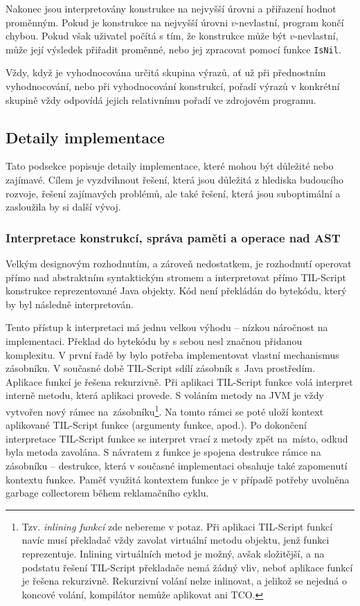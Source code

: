 Nakonec jsou interpretovány konstrukce na nejvyšší úrovni a přiřazení hodnot proměnným. Pokud je
konstrukce na nejvyšší úrovni $v$-nevlastní, program končí chybou. Pokud však uživatel počítá s tím,
že konstrukce může být $v$-nevlastní, může její výsledek přiřadit proměnné, nebo jej zpracovat
pomocí funkce \lstinline{IsNil}.

Vždy, když je vyhodnocována určitá skupina výrazů, ať už při přednostním vyhodnocování, nebo při
vyhodnocování konstrukcí, pořadí výrazů v konkrétní skupině vždy odpovídá jejich relativnímu pořadí
ve zdrojovém programu.

\subsection{Detaily implementace}

Tato podsekce popisuje detaily implementace, které mohou být důležité nebo zajímavé. Cílem je
vyzdvihnout řešení, která jsou důležitá z hlediska budoucího rozvoje, řešení zajímavých problémů,
ale také řešení, která jsou suboptimální a zasloužila by si další vývoj.

\subsubsection{
  Interpretace konstrukcí, správa paměti a operace nad AST}\label{interpretation-of-constructions}

Velkým designovým rozhodnutím, a zároveň nedostatkem, je rozhodnutí operovat přímo nad abstraktním
syntaktickým stromem a interpretovat přímo TIL-Script konstrukce reprezentované Java objekty. Kód
není překládán do bytekódu, který by byl následně interpretován.

Tento přístup k interpretaci má jednu velkou výhodu -- nízkou náročnost na implementaci. Překlad
do bytekódu by s sebou nesl značnou přidanou komplexitu. V první řadě by bylo potřeba implementovat
vlastní mechanismus zásobníku. V současné době TIL-Script sdílí zásobník s~Java prostředím. Aplikace
funkcí je řešena rekurzivně. Při aplikaci TIL-Script funkce volá interpret interně metodu, která
aplikaci provede. S voláním metody na JVM je vždy vytvořen nový rámec na~zásobníku\footnote{
  Tzv. \textit{inlining funkcí} zde nebereme v potaz. Při aplikaci TIL-Script funkcí navíc musí
  překladač vždy zavolat virtuální metodu objektu, jenž funkci reprezentuje. Inlining virtuálních
  metod je možný, avšak složitější, a na podstatu řešení TIL-Script překladače nemá žádný vliv,
  neboť aplikace funkcí je řešena rekurzivně. Rekurzivní volání nelze inlinovat, a jelikož se
  nejedná o koncové volání, kompilátor nemůže aplikovat ani TCO.
}.
Na tomto rámci se poté uloží kontext aplikované TIL-Script funkce (argumenty funkce, apod.).
Po dokončení interpretace TIL-Script funkce se interpret vrací z metody zpět na~místo, odkud byla
metoda zavolána. S návratem z funkce je spojena destrukce rámce na zásobníku -- destrukce, která
v současné implementaci obsahuje také zapomenutí kontextu funkce. Paměť využitá kontextem funkce
je v případě potřeby uvolněna garbage collectorem během reklamačního cyklu.


